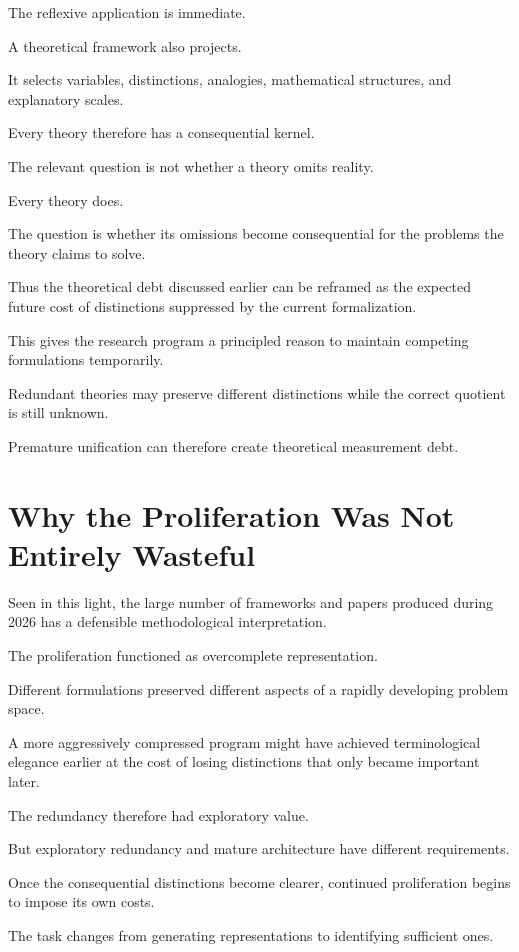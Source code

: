 \documentclass[11pt]{article}
\theoremstyle{remark}
\begin{document}
The reflexive application is immediate.

A theoretical framework also projects.

It selects variables, distinctions, analogies, mathematical structures, and explanatory scales.

Every theory therefore has a consequential kernel.

The relevant question is not whether a theory omits reality.

Every theory does.

The question is whether its omissions become consequential for the problems the theory claims to solve.

Thus the theoretical debt discussed earlier can be reframed as the expected future cost of distinctions suppressed by the current formalization.

This gives the research program a principled reason to maintain competing formulations temporarily.

Redundant theories may preserve different distinctions while the correct quotient is still unknown.

Premature unification can therefore create theoretical measurement debt.

\section{Why the Proliferation Was Not Entirely Wasteful}

Seen in this light, the large number of frameworks and papers produced during 2026 has a defensible methodological interpretation.

The proliferation functioned as overcomplete representation.

Different formulations preserved different aspects of a rapidly developing problem space.

A more aggressively compressed program might have achieved terminological elegance earlier at the cost of losing distinctions that only became important later.

The redundancy therefore had exploratory value.

But exploratory redundancy and mature architecture have different requirements.

Once the consequential distinctions become clearer, continued proliferation begins to impose its own costs.

The task changes from generating representations to identifying sufficient ones.
\end{document}
